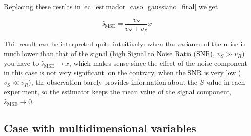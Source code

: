 Replacing these results in \eqref{ec_estimador_caso_gaussiano_final} we get

\begin{equation}
\hat s_{\text{MSE}} = \frac{v_S}{v_S + v_R} x
\end{equation}

This result can be interpreted quite intuitively: when the variance of the noise is much lower than that of the signal (high Signal to Noise Ratio (SNR), $v_S \gg v_R$) you have to  $\hat s_{\text{MSE}} \to x$, which makes sense since the effect of the noise component in this case is not very significant; on the contrary, when the SNR is very low ($v_S \ll v_R$), the observation barely provides information about the $S$ value in each experiment, so the estimator keeps the mean value of the signal component, $\hat s_{\text{MSE}} \to 0$.


\subsection{Case with multidimensional variables}

